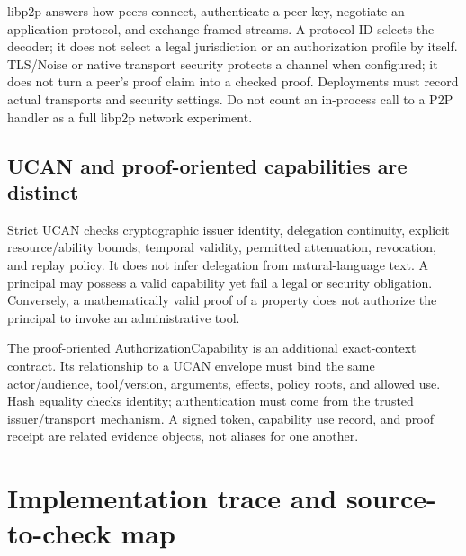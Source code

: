 \documentclass{article}
\begin{document}
libp2p answers how peers connect, authenticate a peer key, negotiate an application protocol, and exchange framed streams. A protocol ID selects the decoder; it does not select a legal jurisdiction or an authorization profile by itself. TLS/Noise or native transport security protects a channel when configured; it does not turn a peer's proof claim into a checked proof. Deployments must record actual transports and security settings. Do not count an in-process call to a P2P handler as a full libp2p network experiment.

\subsection{UCAN and proof-oriented capabilities are distinct}

Strict UCAN checks cryptographic issuer identity, delegation continuity, explicit resource/ability bounds, temporal validity, permitted attenuation, revocation, and replay policy. It does not infer delegation from natural-language text. A principal may possess a valid capability yet fail a legal or security obligation. Conversely, a mathematically valid proof of a property does not authorize the principal to invoke an administrative tool.

The proof-oriented AuthorizationCapability is an additional exact-context contract. Its relationship to a UCAN envelope must bind the same actor/audience, tool/version, arguments, effects, policy roots, and allowed use. Hash equality checks identity; authentication must come from the trusted issuer/transport mechanism. A signed token, capability use record, and proof receipt are related evidence objects, not aliases for one another.

\section{Implementation trace and source-to-check map}
\end{document}
